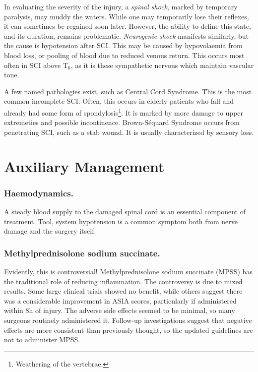In evaluating the severity of the injury, a \textit{spinal shock}, marked by temporary paralysis, may muddy the waters. While one may temporarily lose their reflexes, it can sometimes be regained soon later. However, the ability to define this state, and its duration, remains problematic. \textit{Neurogenic shock} manifests similarly, but the cause is hypotension after SCI. This may be caused by hypovolaemia from blood loss, or pooling of blood due to reduced venous return. This occurs most often in SCI above T$_6$, as it is these sympathetic nervous which maintain vascular tone.\newline

A few named pathologies exist, such as Central Cord Syndrome. This is the most common incomplete SCI. Often, this occurs in elderly patients who fall and already had some form of spondylosis\footnote{Weathering of the vertebrae.}. It is marked by more damage to upper extremeties and possible incontinence. Brown-Séquard Syndrome occurs from penetrating SCI, such as a stab wound. It is usually characterized by sensory loss. 

\section{Auxiliary Management}

\subsubsection{Haemodynamics.}
A steady blood supply to the damaged spinal cord is an essential component of treatment. Tool, system hypotension is a common symptom both from nerve damage and the surgery itself. 

\subsubsection{Methylprednisolone sodium succinate.}
Evidently, this is controversial! Methylprednisolone sodium succinate (MPSS) has the traditional role of reducing inflammation. The controversy is due to mixed results. Some large clinical trials showed no benefit, while others suggest there was a considerable improvement in ASIA scores, particularly if administered within 8h of injury. The adverse side effects seemed to be minimal, so many surgeons routinely administered it. Follow-up investigations suggest that negative effects are more consistent than previously thought, so the updated guidelines are not to administer MPSS. 

